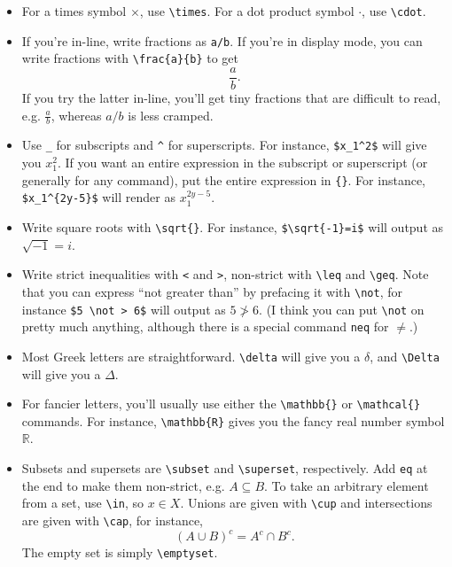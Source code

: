 \documentclass[12pt]{article}
\begin{document}
	\begin{itemize}
		\item For a times symbol $\times$, use \verb|\times|. For a dot product symbol $\cdot$, 
		use \verb|\cdot|. 
		
		\item If you're in-line, write fractions as \verb|a/b|. If you're in display 
		mode, you can write fractions with \verb|\frac{a}{b}| to get
			\[ \frac{a}{b}. \]
		If you try the latter in-line, you'll get tiny fractions that are difficult to 
		read, e.g. $\frac{a}{b}$, whereas $a/b$ is less cramped. 
		
		\item Use \verb|_| for subscripts and \verb|^| for superscripts. For 
		instance, \verb|$x_1^2$| will give you $x_1^2$. If you want an entire expression 
		in the subscript or superscript (or generally for any command), put the entire 
		expression	in \verb|{}|. For instance, \verb|$x_1^{2y-5}$| will render as 
		$x_1^{2y-5}$.
		
		\item Write square roots with \verb|\sqrt{}|. For instance, \verb|$\sqrt{-1}=i$|
		will output as $\sqrt{-1}=i$. 
		
		\item Write strict inequalities with \verb|<| and \verb|>|, non-strict 
		with \verb|\leq| and \verb|\geq|. Note that you can express ``not 
		greater than'' by prefacing it with  \verb|\not|, for instance \verb|$5 \not > 6$|
		will output as $5 \not > 6$.  (I think you can put \verb|\not| on pretty much 
		anything, although there is a special command \verb|neq| for $\neq$.)
		
		\item Most Greek letters are straightforward. \verb|\delta| will give you a
		$\delta$, and \verb|\Delta| will give you a $\Delta$. 
		
		\item For fancier letters, you'll usually use either the \verb|\mathbb{}| or 
		\verb|\mathcal{}| commands. For instance, \verb|\mathbb{R}| gives you
		the fancy real number symbol $\mathbb{R}$.
		
		\item Subsets and supersets are \verb|\subset| and \verb|\superset|, 
		respectively. Add \verb|eq| at the end to make them non-strict, e.g. 
		$A \subseteq B$. To take an arbitrary element from a set, use \verb|\in|, 
		so $x \in X$. Unions are given with \verb|\cup| and intersections are given 
		with \verb|\cap|, for instance,  
			\[	(A \cup B)^c=A^c \cap B^c . \]
		The empty set is simply \verb|\emptyset|. 
		

\end{itemize}
\end{document}
